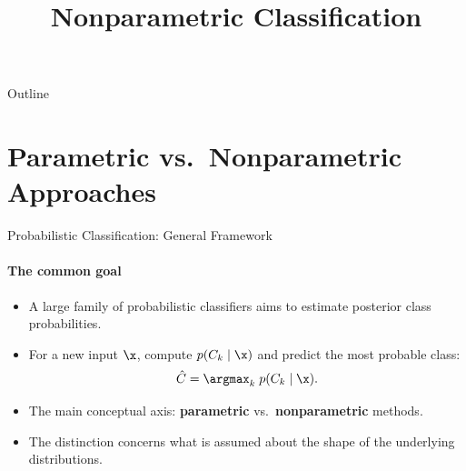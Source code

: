 


%
%


\title[Nonparametric Classification]{Nonparametric Classification}

%

\begin{frame}
  \titlepage
\end{frame}

\begin{frame}{Outline}
  \tableofcontents
\end{frame}

\section{Parametric vs.\ Nonparametric Approaches}

\begin{frame}{Probabilistic Classification: General Framework}
  \framesubtitle{The common goal}
  \begin{itemize}
    \item A large family of probabilistic classifiers aims to estimate \alert{posterior class probabilities}.
    \item For a new input $\x$, compute $p(C_k \mid \x)$ and predict the most probable class:
    \[
      \hat{C} = \argmax_k\; p(C_k \mid \x).
    \]
    \item The main conceptual axis: \textbf{parametric} vs.\ \textbf{nonparametric} methods.
    \item The distinction concerns what is assumed about the shape of the underlying distributions.
  \end{itemize}
\end{frame}

